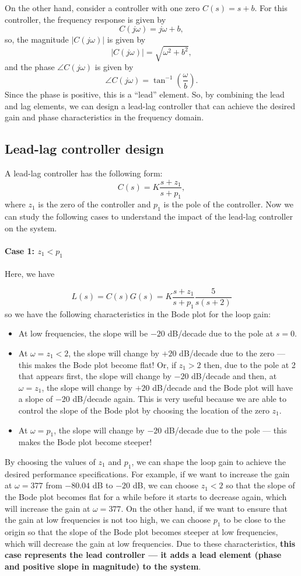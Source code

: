 \documentclass{ee122_notes}
\begin{document}
On the other hand, consider a controller with one zero $C(s) = s + b$. For this controller, the frequency response is given by
\[
C(j\omega) = j\omega + b,
\]
so, the magnitude $|C(j\omega)|$ is given by
\[
|C(j\omega)| = \sqrt{\omega^2 + b^2},
\]
and the phase $\angle C(j\omega)$ is given by
\[
\angle C(j\omega) = \tan^{-1} \left(\frac{\omega}{b}\right).
\]
Since the phase is positive, this is a ``lead'' element. So, by combining the lead and lag elements, we can design a lead-lag controller that can achieve the desired gain and phase characteristics in the frequency domain.

\subsection{Lead-lag controller design}
A lead-lag controller has the following form:
\[
C(s) = K \frac{s + z_1}{s + p_1},
\]
where $z_1$ is the zero of the controller and $p_1$ is the pole of the controller. Now we can study the following cases to understand the impact of the lead-lag controller on the system.

\paragraph{Case 1: $z_1 < p_1$}
Here, we have 

\[ L(s) = C(s)G(s) = K \frac{s + z_1}{s + p_1} \frac{5}{s(s + 2)} \]
so we have the following characteristics in the Bode plot for the loop gain:
\begin{itemize}
    \item At low frequencies, the slope will be $-20$ dB/decade due to the pole at $s = 0$.
    \item At $\omega = z_1 < 2$, the slope will change by $+20$ dB/decade due to the zero --- this makes the Bode plot become flat! Or, if $z_1 > 2$ then, due to the pole at 2 that appears first, the slope will change by $-20$ dB/decade and then, at $\omega = z_1$, the slope will change by $+20$ dB/decade and the Bode plot will have a slope of $-20$ dB/decade again. This is very useful because we are able to control the slope of the Bode plot by choosing the location of the zero $z_1$.
    \item At $\omega = p_1$, the slope will change by $-20$ dB/decade due to the pole --- this makes the Bode plot become steeper!
\end{itemize}
By choosing the values of $z_1$ and $p_1$, we can shape the loop gain to achieve the desired performance specifications. For example, if we want to increase the gain at $\omega = 377$ from $-80.04$ dB to $-20$ dB, we can choose $z_1 < 2$ so that the slope of the Bode plot becomes flat for a while before it starts to decrease again, which will increase the gain at $\omega = 377$. On the other hand, if we want to ensure that the gain at low frequencies is not too high, we can choose $p_1$ to be close to the origin so that the slope of the Bode plot becomes steeper at low frequencies, which will decrease the gain at low frequencies. Due to these characteristics, \textbf{this case represents the lead controller --- it adds a lead element (phase and positive slope in magnitude) to the system}.
\end{document}
